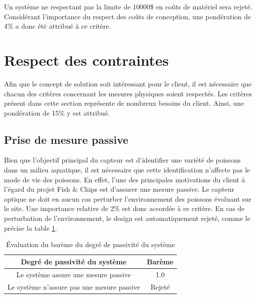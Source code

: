 Un système ne respectant pas la limite de 10000\$ en coûts de matériel sera rejeté. Considérant l'importance du respect des coûts de conception, une pondération de 4\% a donc été attribué à ce critère.


\section{Respect des contraintes}

Afin que le concept de solution soit intéressant pour le client, il est nécessaire que chacun des critères concernant les mesures physiques soient respectés. Les critères présent dans cette section représente de nombreux besoins du client. Ainsi, une pondération de 15\% y est attribué. 

\subsection{Prise de mesure passive}

Bien que l'objectif principal du capteur est d'identifier une variété de poissons dans un milieu aquatique, il est nécessaire que cette identification n'affecte pas le mode de vie des poissons. En effet, l'une des principales motivations du client à l'égard du projet Fish \& Chips est d'assurer une mesure passive. Le capteur optique ne doit en aucun cas perturber l'environnement des poissons évoluant sur le site. Une importance relative de 2\% est donc accordée à ce critère. En cas de perturbation de l'environnement, le design est automatiquement rejeté, comme le précise la table \ref{t:bareme_systeme_passif}.

\begin{table}[htp]
   \footnotesize
   \centering
   \begin{tabular}{|c|c|}
        \hline
        Degré de passivité du système & Barème\\
        \hline
        \hline
        Le système assure une mesure passive & 1.0 \\
        \hline
        Le système n'assure pas une mesure passive & Rejeté \\
        \hline
   \end{tabular}
   \caption{Évaluation du barème du degré de passivité du système}
   \label{t:bareme_systeme_passif}
\end{table}



